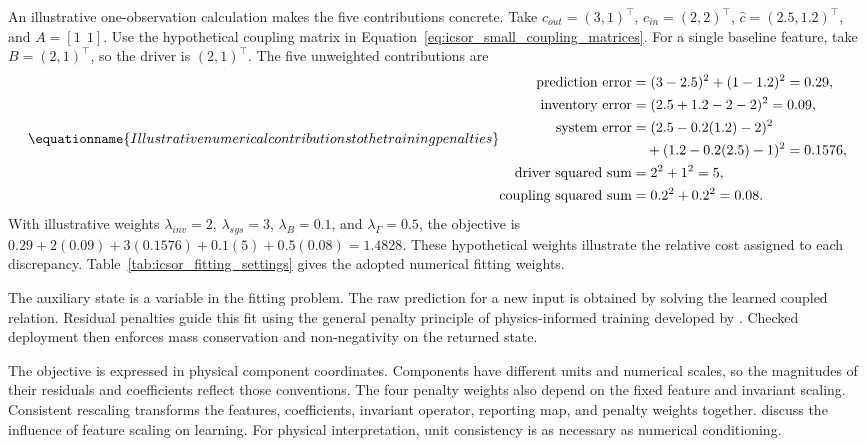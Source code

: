 An illustrative one-observation calculation makes the five contributions concrete. Take \(c_{out}=(3,1)^\top\), \(c_{in}=(2,2)^\top\), \(\widehat c=(2.5,1.2)^\top\), and \(A=[1\ \ 1]\). Use the hypothetical coupling matrix in Equation~\eqref{eq:icsor_small_coupling_matrices}. For a single baseline feature, take \(B=(2,1)^\top\), so the driver is \((2,1)^\top\). The five unweighted contributions are
\begin{equation}
\equationname{Illustrative numerical contributions to the training penalties}
\label{eq:icsor_penalty_numbers}
\begin{aligned}
\text{prediction error}&=(3-2.5)^2+(1-1.2)^2=0.29,\\
\text{inventory error}&=(2.5+1.2-2-2)^2=0.09,\\
\text{system error}&=(2.5-0.2(1.2)-2)^2\\
&\quad +(1.2-0.2(2.5)-1)^2=0.1576,\\
\text{driver squared sum}&=2^2+1^2=5,\\
\text{coupling squared sum}&=0.2^2+0.2^2=0.08.
\end{aligned}
\end{equation}
With illustrative weights \(\lambda_{inv}=2\), \(\lambda_{sys}=3\), \(\lambda_B=0.1\), and \(\lambda_{\Gamma}=0.5\), the objective is \(0.29+2(0.09)+3(0.1576)+0.1(5)+0.5(0.08)=1.4828\). These hypothetical weights illustrate the relative cost assigned to each discrepancy. Table~\ref{tab:icsor_fitting_settings} gives the adopted numerical fitting weights.

The auxiliary state is a variable in the fitting problem. The raw prediction for a new input is obtained by solving the learned coupled relation. Residual penalties guide this fit using the general penalty principle of physics-informed training developed by \citet{Raissi2019}. Checked deployment then enforces mass conservation and non-negativity on the returned state.

The objective is expressed in physical component coordinates. Components have different units and numerical scales, so the magnitudes of their residuals and coefficients reflect those conventions. The four penalty weights also depend on the fixed feature and invariant scaling. Consistent rescaling transforms the features, coefficients, invariant operator, reporting map, and penalty weights together. \citet{Pinheiro2025} discuss the influence of feature scaling on learning. For physical interpretation, unit consistency is as necessary as numerical conditioning.

